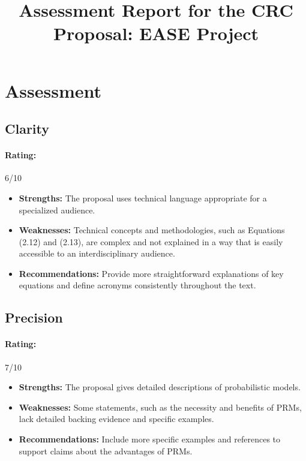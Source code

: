 \documentclass{article}
\begin{document}
\title{Assessment Report for the CRC Proposal: EASE Project}
\author{}
\date{}
\maketitle

\section{Assessment}

\subsection{Clarity}
\paragraph{Rating:} 6/10
\begin{itemize}
    \item \textbf{Strengths:} The proposal uses technical language appropriate for a specialized audience.
    \item \textbf{Weaknesses:} Technical concepts and methodologies, such as Equations (2.12) and (2.13), are complex and not explained in a way that is easily accessible to an interdisciplinary audience.
    \item \textbf{Recommendations:} Provide more straightforward explanations of key equations and define acronyms consistently throughout the text.
\end{itemize}

\subsection{Precision}
\paragraph{Rating:} 7/10
\begin{itemize}
    \item \textbf{Strengths:} The proposal gives detailed descriptions of probabilistic models.
    \item \textbf{Weaknesses:} Some statements, such as the necessity and benefits of PRMs, lack detailed backing evidence and specific examples.
    \item \textbf{Recommendations:} Include more specific examples and references to support claims about the advantages of PRMs.
\end{itemize}
\end{document}
